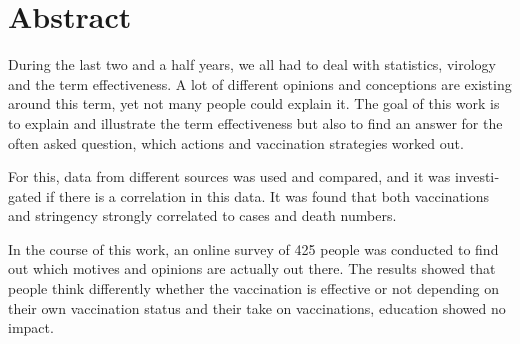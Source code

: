 \chapter{Abstract}

\begin{english}

During the last two and a half years, we all had to deal with statistics, virology and the term effectiveness. A lot of different opinions and conceptions are existing around this term, yet not many people could explain it. The goal of this work is to explain and illustrate the term effectiveness but also to find an answer for the often asked question, which actions and vaccination strategies worked out.

For this, data from different sources was used and compared, and it was investigated if there is a correlation in this data. It was found that both vaccinations and stringency strongly correlated to cases and death numbers.

In the course of this work, an online survey of 425 people was conducted to find out which motives and opinions are actually out there. The results showed that people think differently whether the vaccination is effective or not depending on their own vaccination status and their take on vaccinations, education showed no impact.

\end{english}
